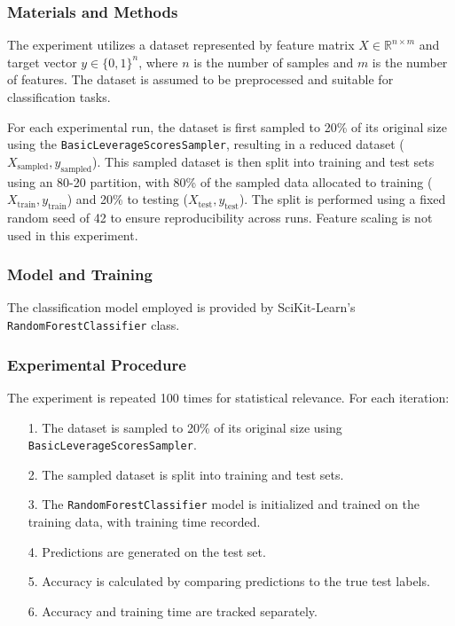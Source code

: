 \documentclass{article}
\theoremstyle{plain}
\theoremstyle{definition}
\theoremstyle{remark}
\begin{document}
\subsubsection{Materials and Methods}

The experiment utilizes a dataset represented by feature matrix $ X \in \mathbb{R}^{n \times m} $ and target vector $ y \in \{0, 1\}^n $, where $ n $ is the number of samples and $ m $ is the number of features. The dataset is assumed to be preprocessed and suitable for classification tasks.

For each experimental run, the dataset is first sampled to 20\% of its original size using the \texttt{BasicLeverageScoresSampler}, resulting in a reduced dataset ($ X_{\text{sampled}}, y_{\text{sampled}} $). This sampled dataset is then split into training and test sets using an 80-20 partition, with 80\% of the sampled data allocated to training ($ X_{\text{train}}, y_{\text{train}} $) and 20\% to testing ($ X_{\text{test}}, y_{\text{test}} $). The split is performed using a fixed random seed of 42 to ensure reproducibility across runs. Feature scaling is not used in this experiment.

\subsubsection{Model and Training}

The classification model employed is provided by SciKit-Learn's \texttt{RandomForestClassifier} class.

\subsubsection{Experimental Procedure}

The experiment is repeated 100 times for statistical relevance. For each iteration:

\begin{itemize}
	\item [1.] The dataset is sampled to 20\% of its original size using \texttt{BasicLeverageScoresSampler}.
	\item [2.] The sampled dataset is split into training and test sets.
	\item [3.] The \texttt{RandomForestClassifier} model is initialized and trained on the training data, with training time recorded.
	\item [4.] Predictions are generated on the test set.
	\item [5.] Accuracy is calculated by comparing predictions to the true test labels.
	\item [6.] Accuracy and training time are tracked separately.
\end{itemize}
\end{document}

